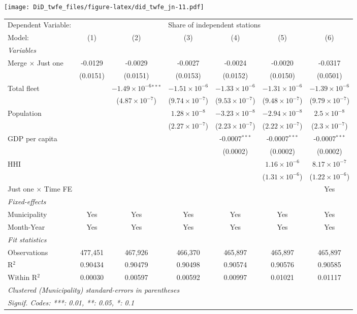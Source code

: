 \documentclass[
]{article}
\begin{document}
\texttt{[image: DiD\_twfe\_files/figure-latex/did\_twfe\_jn-11.pdf]}

\begin{tabular}{lcccccc}
\tabularnewline\midrule\midrule
Dependent Variable:&\multicolumn{6}{c}{Share of independent stations}\\
Model:&(1) & (2) & (3) & (4) & (5) & (6)\\
\midrule \emph{Variables}&   &   &   &   &   &  \\
Merge $\times $ Just one & -0.0129 & -0.0029 & -0.0027 & -0.0024 & -0.0020 & -0.0317\\
  &(0.0151) & (0.0151) & (0.0153) & (0.0152) & (0.0150) & (0.0501)\\
Total fleet &    & $-1.49\times 10^{-6}$$^{***}$ & $-1.51\times 10^{-6}$ & $-1.33\times 10^{-6}$ & $-1.31\times 10^{-6}$ & $-1.39\times 10^{-6}$\\
  &   & ($4.87\times 10^{-7}$) & ($9.74\times 10^{-7}$) & ($9.53\times 10^{-7}$) & ($9.48\times 10^{-7}$) & ($9.79\times 10^{-7}$)\\
Population &    &    & $1.28\times 10^{-8}$ & $-3.23\times 10^{-8}$ & $-2.94\times 10^{-8}$ & $2.5\times 10^{-8}$\\
  &   &    & ($2.27\times 10^{-7}$) & ($2.23\times 10^{-7}$) & ($2.22\times 10^{-7}$) & ($2.3\times 10^{-7}$)\\
GDP per capita &    &    &    & -0.0007$^{***}$ & -0.0007$^{***}$ & -0.0007$^{***}$\\
  &   &    &    & (0.0002) & (0.0002) & (0.0002)\\
HHI &    &    &    &    & $1.16\times 10^{-6}$ & $8.17\times 10^{-7}$\\
  &   &    &    &    & ($1.31\times 10^{-6}$) & ($1.22\times 10^{-6}$)\\
Just one $\times$ Time FE &  &  &  &  &  & Yes\\
\midrule \emph{Fixed-effects}&   &   &   &   &   &  \\
Municipality & Yes & Yes & Yes & Yes & Yes & Yes\\
Month-Year & Yes & Yes & Yes & Yes & Yes & Yes\\
\midrule \emph{Fit statistics}&  & & & & & \\
Observations & 477,451&467,926&466,370&465,897&465,897&465,897\\
R$^2$ & 0.90434&0.90479&0.90498&0.90574&0.90576&0.90585\\
Within R$^2$ & 0.00030&0.00597&0.00592&0.00997&0.01021&0.01117\\
\midrule\midrule\multicolumn{7}{l}{\emph{Clustered (Municipality) standard-errors in parentheses}}\\
\multicolumn{7}{l}{\emph{Signif. Codes: ***: 0.01, **: 0.05, *: 0.1}}\\
\end{tabular}
\end{document}
